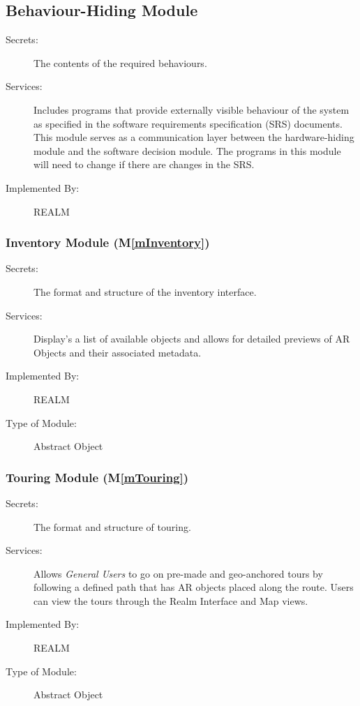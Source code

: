 \documentclass[12pt, titlepage]{article}
\newcommand{\mref}[1]{M\ref{#1}}
\begin{document}
\subsection{Behaviour-Hiding Module}

\begin{description}
\item[Secrets:]The contents of the required behaviours.
\item[Services:]Includes programs that provide externally visible behaviour of
  the system as specified in the software requirements specification (SRS)
  documents. This module serves as a communication layer between the
  hardware-hiding module and the software decision module. The programs in this
  module will need to change if there are changes in the SRS.
\item[Implemented By:] REALM
\end{description}


\subsubsection{Inventory Module (\mref{mInventory})}

\begin{description}
\item[Secrets:]The format and structure of the inventory interface.
\item[Services:]Display's a list of available objects and allows for detailed previews of AR Objects and their associated metadata.
\item[Implemented By:]REALM
\item[Type of Module:]Abstract Object
\end{description}

\subsubsection{Touring Module (\mref{mTouring})}

\begin{description}
\item[Secrets:]The format and structure of touring.
\item[Services:]Allows \textit{General Users} to go on pre-made and geo-anchored tours by following a defined path that has AR objects placed along the route. Users can view the tours through the Realm Interface and Map views.
\item[Implemented By:]REALM
\item[Type of Module:]Abstract Object
\end{description}
\end{document}
